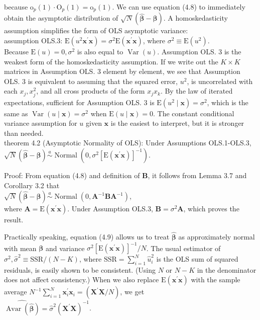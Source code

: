 \documentclass[10pt]{article}
\begin{document}
because $\mathrm{o}_{p}(1) \cdot \mathrm{O}_{p}(1)=\mathrm{o}_{p}(1)$. We can use equation (4.8) to immediately obtain the asymptotic distribution of $\sqrt{N}(\hat{\boldsymbol{\beta}}-\boldsymbol{\beta})$. A homoskedasticity assumption simplifies the form of OLS asymptotic variance:\\
assumption OLS.3: $\mathrm{E}\left(u^{2} \mathbf{x}^{\prime} \mathbf{x}\right)=\sigma^{2} \mathrm{E}\left(\mathbf{x}^{\prime} \mathbf{x}\right)$, where $\sigma^{2} \equiv \mathrm{E}\left(u^{2}\right)$.\\
Because $\mathrm{E}(u)=0, \sigma^{2}$ is also equal to $\operatorname{Var}(u)$. Assumption OLS. 3 is the weakest form of the homoskedasticity assumption. If we write out the $K \times K$ matrices in Assumption OLS. 3 element by element, we see that Assumption OLS. 3 is equivalent to assuming that the squared error, $u^{2}$, is uncorrelated with each $x_{j}, x_{j}^{2}$, and all cross products of the form $x_{j} x_{k}$. By the law of iterated expectations, sufficient for Assumption OLS. 3 is $\mathrm{E}\left(u^{2} \mid \mathbf{x}\right)=\sigma^{2}$, which is the same as $\operatorname{Var}(u \mid \mathbf{x})=\sigma^{2}$ when $\mathrm{E}(u \mid \mathbf{x})=0$. The constant conditional variance assumption for $u$ given $\mathbf{x}$ is the easiest to interpret, but it is stronger than needed.\\
theorem 4.2 (Asymptotic Normality of OLS): Under Assumptions OLS.1-OLS.3,\\
$\sqrt{N}(\hat{\boldsymbol{\beta}}-\boldsymbol{\beta}) \stackrel{a}{\sim} \operatorname{Normal}\left(0, \sigma^{2}\left[\mathrm{E}\left(\mathbf{x}^{\prime} \mathbf{x}\right)\right]^{-1}\right)$.

Proof: From equation (4.8) and definition of $\mathbf{B}$, it follows from Lemma 3.7 and Corollary 3.2 that\\
$\sqrt{N}(\hat{\boldsymbol{\beta}}-\boldsymbol{\beta}) \stackrel{a}{\sim} \operatorname{Normal}\left(0, \mathbf{A}^{-1} \mathbf{B A}^{-1}\right)$,\\
where $\mathbf{A}=\mathrm{E}\left(\mathbf{x}^{\prime} \mathbf{x}\right)$. Under Assumption OLS.3, $\mathbf{B}=\sigma^{2} \mathbf{A}$, which proves the result.

Practically speaking, equation (4.9) allows us to treat $\hat{\boldsymbol{\beta}}$ as approximately normal with mean $\boldsymbol{\beta}$ and variance $\sigma^{2}\left[\mathrm{E}\left(\mathbf{x}^{\prime} \mathbf{x}\right)\right]^{-1} / N$. The usual estimator of $\sigma^{2}, \hat{\sigma}^{2} \equiv \mathrm{SSR} / (N-K)$, where $\mathrm{SSR}=\sum_{i=1}^{N} \hat{u}_{i}^{2}$ is the OLS sum of squared residuals, is easily shown to be consistent. (Using $N$ or $N-K$ in the denominator does not affect consistency.) When we also replace $\mathrm{E}\left(\mathbf{x}^{\prime} \mathbf{x}\right)$ with the sample average $N^{-1} \sum_{i=1}^{N} \mathbf{x}_{i}^{\prime} \mathbf{x}_{i}=\left(\mathbf{X}^{\prime} \mathbf{X} / N\right)$, we get\\
$\widehat{\operatorname{Avar}(\hat{\boldsymbol{\beta}})}=\hat{\sigma}^{2}\left(\mathbf{X}^{\prime} \mathbf{X}\right)^{-1}$.
\end{document}
